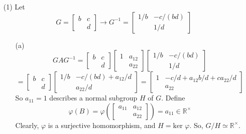 %
%
\begin{itemize}
\item[(1)]
Let
$$G = \begin{bmatrix}
b & c \\
& d
\end{bmatrix} \rightarrow G^{-1} = \begin{bmatrix}
1/b & -c/(bd) \\
& 1/d
\end{bmatrix}$$
\begin{itemize}
\item[(a)]
$$GAG^{-1} = \begin{bmatrix}
b & c \\
& d
\end{bmatrix}\begin{bmatrix}
1 & a_{12} \\
& a_{22}
\end{bmatrix}\begin{bmatrix}
1/b & -c/(bd) \\
& 1/d
\end{bmatrix}$$
$$= \begin{bmatrix}
b & c \\
& d
\end{bmatrix}\begin{bmatrix}
1/b & -c/(bd) + a_{12}/d \\
& a_{22}/d
\end{bmatrix} = \begin{bmatrix}
1 & -c/d + a_{12}b/d + ca_{22}/d \\
& a_{22}
\end{bmatrix}$$
So $a_{11} = 1$ describes a normal subgroup $H$ of $G$. Define
$$\varphi(B) = \varphi\left(\begin{bmatrix}
a_{11} & a_{12} \\
& a_{22}
\end{bmatrix}\right) = a_{11} \in \mathbb{R}^\times$$
Clearly, $\varphi$ is a surjective homomorphism, and $H = \text{ker }\varphi$. So, $G/H \simeq \mathbb{R}^\times$.

\end{itemize}
\end{itemize}
